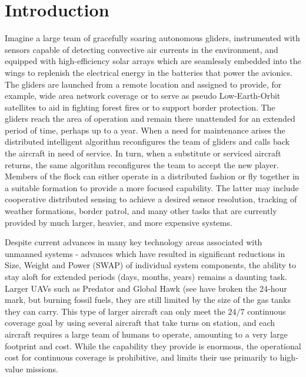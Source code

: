 \documentclass{ifacconf}
\begin{document}
\section{Introduction}
Imagine a large team of gracefully soaring autonomous gliders, instrumented with sensors capable of detecting convective air currents in the environment, and equipped with high-efficiency solar arrays which are seamlessly embedded into the wings to replenish the electrical energy in the batteries that power the avionics. The gliders are launched from a remote location and assigned to provide, for example, wide area network coverage or to serve as pseudo Low-Earth-Orbit satellites to aid in fighting forest fires or to support border protection. The gliders reach the area of operation and remain there unattended for an extended period of time, perhaps up to a year. When a need for maintenance arises the distributed intelligent algorithm reconfigures the team of gliders and calls back the aircraft in need of service. In turn, when a substitute or serviced aircraft returns, the same algorithm reconfigures the team to accept the new player. Members of the flock can either operate in a distributed fashion or fly together in a suitable formation to provide a more focused capability. The latter may include cooperative distributed sensing to achieve a desired sensor resolution, tracking of weather formations, border patrol, and many other tasks that are currently provided by much larger, heavier, and more expensive systems.

Despite current advances in many key technology areas associated with unmanned systems - advances which have resulted in significant reductions in Size, Weight and Power (SWAP) of individual system components, the ability to stay aloft for extended periods (days, months, years) remains a daunting task. Larger UAVs such as Predator and Global Hawk (see \cite{Best:2005} have broken the 24-hour mark, but burning fossil fuels, they are still limited by the size of the gas tanks they can carry. This type of larger aircraft can only meet the $24/7$ continuous coverage goal by using several aircraft that take turns on station, and each aircraft requires a large team of humans to operate, amounting to a very large footprint and cost. While the capability they provide is enormous, the operational cost for continuous coverage is prohibitive, and limits their use primarily to high-value missions.
\end{document}
